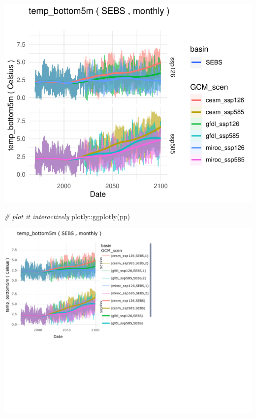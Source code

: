 \documentclass[
]{article}
\newenvironment{Shaded}{\begin{snugshade}}{\end{snugshade}}
\newcommand{\CommentTok}[1]{\textcolor[rgb]{0.56,0.35,0.01}{\textit{#1}}}
\newcommand{\FunctionTok}[1]{\textcolor[rgb]{0.00,0.00,0.00}{#1}}
\newcommand{\NormalTok}[1]{#1}
\newcommand{\SpecialCharTok}[1]{\textcolor[rgb]{0.00,0.00,0.00}{#1}}
\begin{document}
\begin{center}\includegraphics{ACLIM2_quickStart_files/figure-latex/ewe-2} \end{center}

\begin{Shaded}
\begin{Highlighting}[]
  \CommentTok{\# plot it interactively}
\NormalTok{  plotly}\SpecialCharTok{::}\FunctionTok{ggplotly}\NormalTok{(pp)}
\end{Highlighting}
\end{Shaded}

\begin{center}\includegraphics{ACLIM2_quickStart_files/figure-latex/unnamed-chunk-9-1} \end{center}
\end{document}
